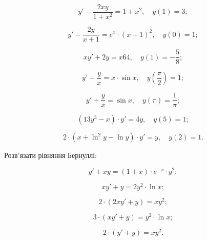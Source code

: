 \begin{problem}
	\[y'-\frac{2xy}{1+x^2}=1+x^2, \quad y(1)=3;\]
\end{problem}

\begin{problem}
	\[y'-\frac{2y}{x+1}=e^{x}\cdot(x+1)^2, \quad y(0)=1;\]
\end{problem}

\begin{problem}
	\[xy'+2y=x64,\quad y(1)=-\frac58;\]	
\end{problem}

\begin{problem}
	\[ y' - \frac yx  = x \cdot \sin x, \quad y\left(\frac\pi2\right)=1;\]
\end{problem}

\begin{problem}
	\[y'+\frac yx=\sin x, \quad y(\pi)=\frac1\pi;\]
\end{problem}

\begin{problem}
	\[(13y^3-x)\cdot y'=4y, \quad y(5)=1;\]
\end{problem}

\begin{problem}
	\[2\cdot(x+\ln^2y-\ln y)\cdot y'= y, \quad y(2)=1.\]
\end{problem}

Розв'язати рівняння Бернуллі:
\begin{multicols}{2}
	\begin{problem}
		\[y'+xy=(1+x)\cdot e^{-x}\cdot y^2;\]
	\end{problem}
	
	\begin{problem}
		\[xy'+y=2y^2\cdot \ln x;\]
	\end{problem}
	
	\begin{problem}
		\[2\cdot(2xy'+y)=xy^2;\]
	\end{problem}
	
	\begin{problem}
		\[3\cdot(xy'+y)=y^2\cdot \ln x;\]
	\end{problem}

	\begin{problem}
		\[2\cdot(y'+y)=xy^2.\]
	\end{problem}
\end{multicols}

